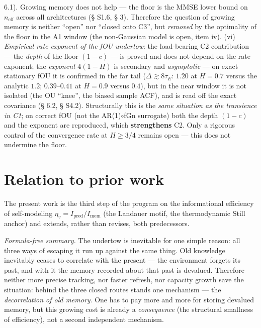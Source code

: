 \documentclass[12pt]{iopart}
\begin{document}
6.1). Growing memory does not help --- the floor is the MMSE lower bound on \(n_{\text{eff}}\) across all architectures (§ S1.6, § 3). Therefore the question of growing memory is neither ``open'' nor ``closed onto C3'', but \emph{removed} by the optimality of the floor in the A1 window (the non-Gaussian model is open, item iv). (vi) \emph{Empirical rate exponent of the fOU undertow}: the load-bearing C2 contribution --- the \emph{depth} of the floor \((1-c)\) --- is proved and does not depend on the rate exponent; the \emph{exponent} \(4(1-H)\) is secondary and \emph{asymptotic} --- on exact stationary fOU it is confirmed in the far tail (\(\Delta \gtrsim 8\tau_E\): \(1.20\) at \(H = 0.7\) versus the analytic \(1.2\); \(0.39\)--\(0.41\) at \(H = 0.9\) versus \(0.4\)), but in the near window it is not isolated (the OU ``knee'', the biased sample ACF), and is read off the exact covariance (§ 6.2, § S4.2). Structurally this is the \emph{same situation as the transience in C1}; on correct fOU (not the AR(1)\(\circ\)fGn surrogate) both the depth \((1-c)\) and the exponent are reproduced, which \textbf{strengthens} C2. Only a rigorous control of the convergence rate at \(H \ge 3/4\) remains open --- this does not undermine the floor.



\section{Relation to prior work}\label{relation-to-prior-work}



The present work is the third step of the program on the informational efficiency of self-modeling \(\eta_v = I_{\text{pred}}/I_{\text{mem}}\) (the Landauer motif, the thermodynamic Still anchor) and extends, rather than revises, both predecessors.



\emph{Formula-free summary.} The undertow is inevitable for one simple reason: all three ways of escaping it run up against the same thing. Old knowledge inevitably ceases to correlate with the present --- the environment forgets its past, and with it the memory recorded about that past is devalued. Therefore neither more precise tracking, nor faster refresh, nor capacity growth save the situation: behind the three closed routes stands one mechanism --- the \emph{decorrelation of old memory}. One has to pay more and more for storing devalued memory, but this growing cost is already a \emph{consequence} (the structural smallness of efficiency), not a second independent mechanism.
\end{document}

